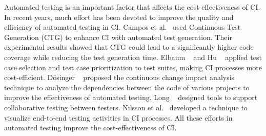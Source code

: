 

Automated testing is an important factor that affects the cost-effectiveness 
of CI. 
In recent years, much effort has been devoted to improve the quality and 
efficiency of automated testing in CI. 
Campos et al.~\cite{campos2014continuous} used Continuous Test Generation 
(CTG) to enhance CI with automated test generation. 
Their experimental results showed that CTG could lead to a significantly 
higher code coverage while reducing the test generation time. 
Elbaum \etal~\cite{elbaum2014techniques} and Hu 
\etal~\cite{hu2016Implementation} applied test case selection and test case 
prioritization to test suites, making CI processes more cost-efficient. 
D{\"o}singer \etal~\cite{dosinger2012communicating} proposed the continuous 
change impact analysis technique to analyze the dependencies between the 
code of various projects to improve the effectiveness of automated testing. 
Long \etal~\cite{long2015collaborative} designed tools to support collaborative 
testing between testers. 
Nilsson et al.~\cite{nilsson2014visualizing} developed a technique to visualize 
end-to-end testing activities in CI processes. 
All these efforts in automated testing improve the cost-effectiveness of CI. 

 
